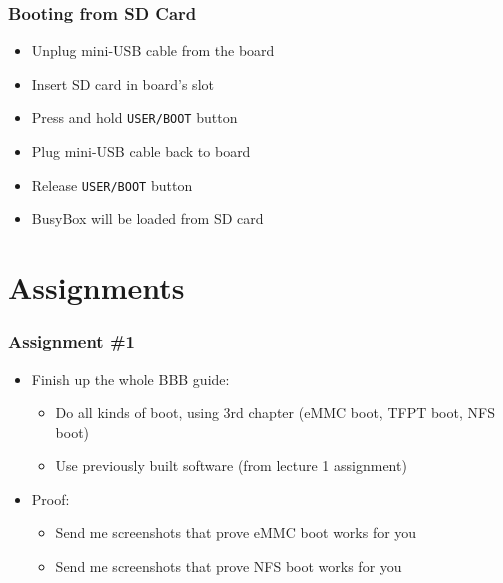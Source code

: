 \documentclass[aspectratio=169]{beamer}
\begin{document}
\begin{frame}[fragile]
  \frametitle{Booting from SD Card}
  \begin{itemize}
    \item Unplug mini-USB cable from the board
    \item Insert SD card in board's slot
    \item Press and hold \texttt{USER/BOOT} button
    \item Plug mini-USB cable back to board
    \item Release \texttt{USER/BOOT} button
    \item BusyBox will be loaded from SD card
  \end{itemize}
\end{frame}

\section*{Assignments}

\begin{frame}
  \frametitle{Assignment \#1}
  \begin{itemize}
    \item Finish up the whole BBB guide:
      \begin{itemize}
        \item Do all kinds of boot, using 3rd chapter (eMMC boot, TFPT boot,
              NFS boot)
        \item Use previously built software (from lecture 1 assignment)
      \end{itemize}
    \item Proof:
      \begin{itemize}
        \item Send me screenshots that prove eMMC boot works for you
        \item Send me screenshots that prove NFS boot works for you
      \end{itemize}
  \end{itemize}
\end{frame}
\end{document}
